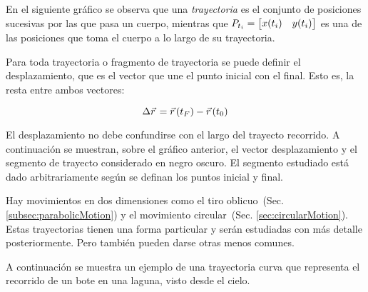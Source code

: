 En el siguiente gráfico se observa que una \emph{trayectoria} es el conjunto de posiciones sucesivas por las que pasa un cuerpo, mientras que $P_{t_i}={ \begin{bmatrix} x(t_i)&y(t_i) \end{bmatrix} }$ es una de las posiciones que toma el cuerpo a lo largo de su trayectoria.

\begin{center}
    \def\svgwidth{\linewidth}
    
\end{center}  

Para toda trayectoria o fragmento de trayectoria se puede definir el desplazamiento, que es el vector que une el punto inicial con el final.
Esto es, la resta entre ambos vectores:

\begin{mdframed}[style=DefinitionFrame]
    \begin{defn}
        \label{defn:desplazamiento}
    \end{defn}
    \begin{equation*}
        \Delta \vec{r}\hspace{0.05cm} = \vec{r}\hspace{0.05cm}(t_F) - \vec{r}\hspace{0.05cm}(t_0)
    \end{equation*}
\end{mdframed}

El desplazamiento no debe confundirse con el largo del trayecto recorrido.
A continuación se muestran, sobre el gráfico anterior, el vector desplazamiento y el segmento de trayecto considerado en negro oscuro.
El segmento estudiado está dado arbitrariamente según se definan los puntos inicial y final.

\begin{center}
    \def\svgwidth{\linewidth}
    
\end{center}

Hay movimientos en dos dimensiones como el tiro oblicuo~(Sec. \ref{subsec:parabolicMotion}) y el movimiento circular~(Sec. \ref{sec:circularMotion}).
Estas trayectorias tienen una forma particular y serán estudiadas con más detalle posteriormente.
Pero también pueden darse otras menos comunes.

A continuación se muestra un ejemplo de una trayectoria curva que representa el recorrido de un bote en una laguna, visto desde el cielo.

